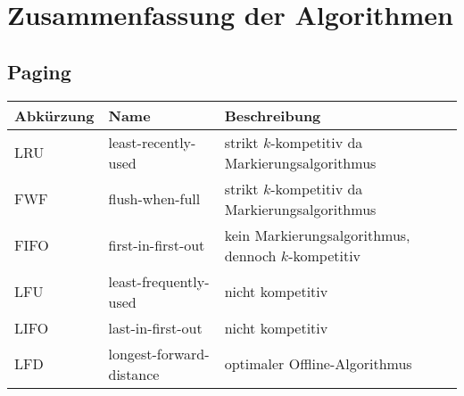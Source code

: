 \chapter{Zusammenfassung der Algorithmen}

\section{Paging}
\begin{tabular}{|l|l|l|} \hline
Abkürzung & Name & Beschreibung\\ \hline \hline
LRU  & least-recently-used      & strikt $k$-kompetitiv da Markierungsalgorithmus \\ \hline
FWF  & flush-when-full          & strikt $k$-kompetitiv da Markierungsalgorithmus \\ \hline
FIFO & first-in-first-out       & kein Markierungsalgorithmus, dennoch $k$-kompetitiv \\ \hline
LFU  & least-frequently-used    & nicht kompetitiv\\ \hline
LIFO & last-in-first-out        & nicht kompetitiv\\ \hline
LFD  & longest-forward-distance & optimaler Offline-Algorithmus \\ \hline
\end{tabular}
